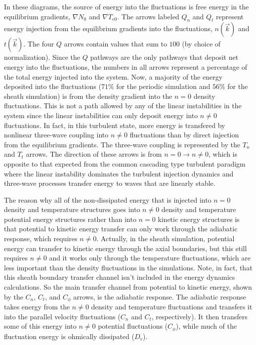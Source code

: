 \documentclass[showpacs,preprintnumbers,amsmath,amssymb,superscriptaddress,aip]{revtex4-1}
\begin{document}
In these diagrams, the source of energy into the fluctuations is free energy in the equilibrium gradients, 
$\nabla N_0$ and $\nabla T_{e0}$. The arrows labeled $Q_n$ and $Q_t$ represent energy injection from
the equilibrium gradients into the fluctuations, $n(\vec{k})$ and $t(\vec{k})$. The four $Q$ arrows contain values that sum to $100$ (by choice of normalization). 
Since the $Q$ pathways are the only pathways that deposit
net energy into the fluctuations, the numbers in all arrows represent a percentage of the total energy injected into the system.
Now, a majority of the energy deposited into the fluctuations ($71\%$
for the periodic simulation and $56\%$ for the sheath simulation)
is from the density gradient into the $n=0$ density fluctuations. This is not a path allowed by any of the linear instabilities in the system since
the linear instabilities can only deposit energy into $n \ne 0$ fluctuations.
In fact, in this turbulent state, more energy is transfered by nonlinear three-wave coupling into $n \ne 0$ fluctuations than by direct injection from the equilibrium gradients. The three-wave
coupling is represented by the $T_n$ and $T_t$ arrows. The direction of these arrows is from $n=0 \rightarrow n \ne 0$, which is opposite to that expected from the common cascading type 
turbulent paradigm where the linear instability dominates the turbulent injection dynamics and three-wave processes transfer energy to waves that are linearly stable.

The reason why all of the non-dissipated energy that is injected into $n=0$ density and temperature structures goes into 
$n \ne 0$ density and temperature potential energy structures rather than into $n=0$
kinetic energy structures is that potential to kinetic energy transfer can only work through the adiabatic response, which requires $n \ne 0$. Actually, in the sheath simulation, potential energy
can transfer to kinetic energy through the axial boundaries, but this still requires $n \ne 0$ and it works only through the temperature fluctuations, which are less important than the density
fluctuations in the simulations. Note, in fact, that this sheath boundary transfer channel isn't included in the energy dynamics calculations.
So the main transfer channel from potential to kinetic energy, shown by the $C_n$, $C_t$, and $C_\phi$ arrows, is the adiabatic response. The adiabatic response takes energy
from the $n \ne 0$ density and temperature fluctuations and transfers it into the parallel velocity fluctuations ($C_n$ and $C_t$, respectively). It then transfers some of this energy into
$n \ne 0$ potential fluctuations ($C_\phi$), while much of the fluctuation energy is ohmically dissipated ($D_v$).
\end{document}
